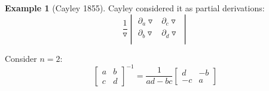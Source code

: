 \documentclass[a4paper,landscape,twocolumn]{article}
\theoremstyle{definition}
\newtheorem{ex}{Example}
\begin{document}
\begin{ex}[Cayley 1855]
  Cayley considered it as partial derivations:
  \[
    \frac{1}{\triangledown}
    \begin{vmatrix}
      \partial_a \triangledown & \partial_c \triangledown \\
      \partial_b \triangledown & \partial_d \triangledown \\
    \end{vmatrix}
  \]

  Consider $n=2$:
  \[
    \begin{bmatrix}
      a & b \\
      c & d
    \end{bmatrix}^{-1}
    = \frac{1}{ad - bc}
    \begin{bmatrix}
      d & -b \\
      -c & a
    \end{bmatrix}
  \]


\end{ex}
\end{document}
